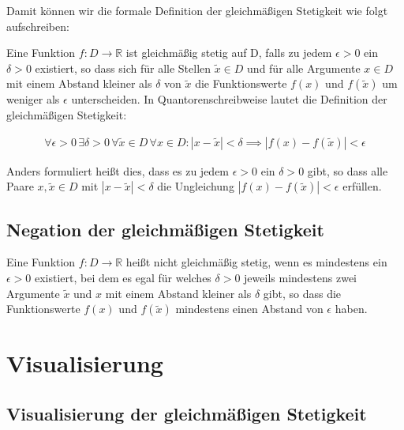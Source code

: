 \documentclass[fontsize=9pt,
               parskip=half-,
               DIV=14,
               listof=chapterentry,
               tocflat]{scrbook}
\begin{document}
Damit können wir die formale Definition der gleichmäßigen Stetigkeit wie folgt aufschreiben:

\begin{definition*}
Eine Funktion $f:D\to \mathbb {R} $ ist gleichmäßig stetig auf D, falls zu jedem $\epsilon >0$ ein $\delta >0$ existiert, so dass sich für alle Stellen ${\tilde {x}}\in D$ und für alle Argumente $x\in D$ mit einem Abstand kleiner als $\delta $ von ${\tilde {x}}$ die Funktionswerte $f(x)$ und $f({\tilde {x}})$ um weniger als $\epsilon $ unterscheiden. In Quantorenschreibweise lautet die Definition der gleichmäßigen Stetigkeit:

\begin{align*}
\forall \epsilon >0\,\exists \delta >0\,\forall {\tilde {x}}\in D\,\forall x\in D:|x-{\tilde {x}}|<\delta \implies |f(x)-f({\tilde {x}})|<\epsilon 
\end{align*}

\end{definition*}

Anders formuliert heißt dies, dass es zu jedem $\epsilon >0$ ein $\delta >0$ gibt, so dass alle Paare $x,{\tilde {x}}\in D$ mit $|x-{\tilde {x}}|<\delta $ die Ungleichung $|f(x)-f({\tilde {x}})|<\epsilon $ erfüllen.

\subsection{Negation der gleichmäßigen Stetigkeit}

\begin{definition*}
Eine Funktion $f:D\to \mathbb {R} $ heißt nicht gleichmäßig stetig, wenn es mindestens ein $\epsilon >0$ existiert, bei dem es egal für welches $\delta >0$ jeweils mindestens zwei Argumente ${\tilde {x}}$ und $x$ mit einem Abstand kleiner als $\delta $ gibt, so dass die Funktionswerte $f(x)$ und $f({\tilde {x}})$ mindestens einen Abstand von $\epsilon $ haben.

\end{definition*}

\section{Visualisierung}

\subsection{Visualisierung der gleichmäßigen Stetigkeit}
\end{document}

